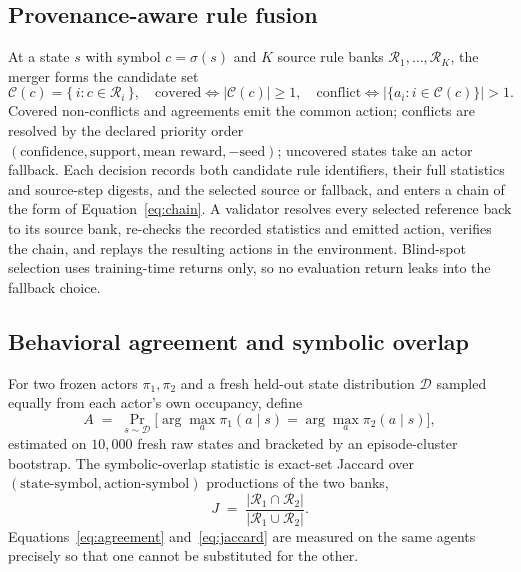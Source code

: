 \documentclass[11pt]{article}
\newcommand{\sest}{\sigma}
\newcommand{\Cand}{\mathcal{C}}
\newcommand{\Rules}{\mathcal{R}}
\begin{document}
\subsection{Provenance-aware rule fusion}
\label{sec:fusion}
At a state $s$ with symbol $c=\sest(s)$ and $K$ source rule banks $\Rules_1,\dots,\Rules_K$, the
merger forms the candidate set
\begin{equation}
\Cand(c)=\{\,i : c\in\Rules_i\,\},\quad
\text{covered}\iff|\Cand(c)|\ge1,\quad
\text{conflict}\iff\big|\{a_i:i\in\Cand(c)\}\big|>1 .
\label{eq:fusion}
\end{equation}
Covered non-conflicts and agreements emit the common action; conflicts are resolved by the
declared priority order $(\text{confidence},\text{support},\text{mean reward},-\text{seed})$;
uncovered states take an actor fallback. Each decision records both candidate rule identifiers,
their full statistics and source-step digests, and the selected source or fallback, and enters a
chain of the form of Equation~\eqref{eq:chain}. A validator resolves every selected reference
back to its source bank, re-checks the recorded statistics and emitted action, verifies the chain,
and replays the resulting actions in the environment. Blind-spot selection uses training-time
returns only, so no evaluation return leaks into the fallback choice.

\subsection{Behavioral agreement and symbolic overlap}
\label{sec:behavior}
For two frozen actors $\pi_1,\pi_2$ and a fresh held-out state distribution $\mathcal{D}$ sampled
equally from each actor's own occupancy, define
\begin{equation}
A \;=\; \Pr_{s\sim\mathcal{D}}\!\big[\arg\max_a \pi_1(a\mid s)=\arg\max_a \pi_2(a\mid s)\big],
\label{eq:agreement}
\end{equation}
estimated on $10{,}000$ fresh raw states and bracketed by an episode-cluster bootstrap. The
symbolic-overlap statistic is exact-set Jaccard over $(\text{state-symbol},\text{action-symbol})$
productions of the two banks,
\begin{equation}
J \;=\; \frac{|\Rules_1\cap \Rules_2|}{|\Rules_1\cup \Rules_2|}.
\label{eq:jaccard}
\end{equation}
Equations~\eqref{eq:agreement} and~\eqref{eq:jaccard} are measured on the same agents precisely so
that one cannot be substituted for the other.
\end{document}
